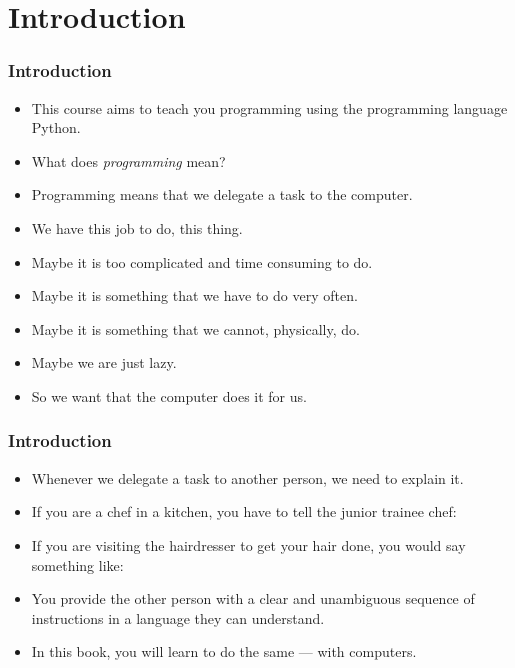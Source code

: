 \documentclass[aspectratio=169,mathserif,notheorems]{beamer}%
\subtitle{Introduction}%
\begin{document}
%
%
\startPresentation%
%
\section{Introduction}%
%
\begin{frame}%
\frametitle{Introduction}%
\begin{itemize}%
\item This course aims to teach you programming using the programming language Python.%
\item<2-> What does \emph{programming} mean?%
\item<3-> Programming means that we delegate a task to the computer.%
\item<4-> We have this job to do, this thing.%
\item<5-> Maybe it is too complicated and time consuming to do.%
\item<6-> Maybe it is something that we have to do very often.%
\item<7-> Maybe it is something that we cannot, physically, do.%
\item<8-> Maybe we are just lazy.%
\item<9-> So we want that the computer does it for us.%
\end{itemize}%
\end{frame}%
%
\begin{frame}%
\frametitle{Introduction}%
\begin{itemize}%
\item Whenever we delegate a task to another person, we need to explain it.%
\item<2-> If you are a chef in a kitchen, you have to tell the junior trainee chef: %
\item<3-> If you are visiting the hairdresser to get your hair done, you would say something like:
\item<4-> You provide the other person with a clear and unambiguous sequence of instructions in a language they can understand.%
\item<5-> In this book, you will learn to do the same --- with computers.%
\end{itemize}%
\end{frame}%
%
%
\end{document}
